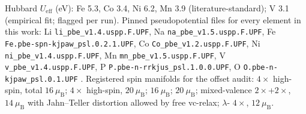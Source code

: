 \documentclass[reprint,aps,prb,amsmath,amssymb,nofootinbib,longbibliography]{revtex4-2}
\begin{document}
\begin{table}[tb]
\caption{\label{tab:ledger}The complete verified ledger at submission.
Every row is voltage-only (kinetics and hull screens pending); anchor
weight 0 marks rows that can never enter a retrain. The 
row is computed-only: the calculated couple is /
desodiation, for which no experimental average voltage exists at curation
grade A or B (the measured $\sim$\SI{2.5}{\volt} plateau belongs to the
/ insertion couple \cite{nfp2016}), so it anchors
nothing and touches no experimental claim.}

\end{table}

Hubbard $U_{\mathrm{eff}}$ (eV): Fe 5.3, Co 3.4, Ni 6.2, Mn 3.9
(literature-standard); V 3.1 (empirical fit; flagged per run). Pinned
pseudopotential files for every element in this work: Li
\texttt{li\_pbe\_v1.4.uspp.F.UPF}, Na \texttt{na\_pbe\_v1.5.uspp.F.UPF},
Fe \texttt{Fe.pbe-spn-kjpaw\_psl.0.2.1.UPF}, Co
\texttt{Co\_pbe\_v1.2.uspp.F.UPF}, Ni \texttt{ni\_pbe\_v1.4.uspp.F.UPF},
Mn \texttt{mn\_pbe\_v1.5.uspp.F.UPF}, V \texttt{v\_pbe\_v1.4.uspp.F.UPF},
P \texttt{P.pbe-n-rrkjus\_psl.1.0.0.UPF}, O
\texttt{O.pbe-n-kjpaw\_psl.0.1.UPF} \cite{garrity2014,dalcorso2014}.
Registered spin manifolds for the offset audit: 
$4\times$ high-spin, total $16~\mu_{\mathrm{B}}$; 
$4\times$ high-spin, $20~\mu_{\mathrm{B}}$; 
$16~\mu_{\mathrm{B}}$;  $20~\mu_{\mathrm{B}}$;  mixed-valence
$2\times$+$2\times$, $14~\mu_{\mathrm{B}}$ with
Jahn--Teller distortion allowed by free vc-relax; $\lambda$-
$4\times$, $12~\mu_{\mathrm{B}}$.


\end{document}
